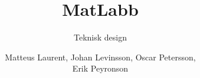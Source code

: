 \documentclass{beamer}
\title{MatLabb}
\subtitle{Teknisk design}
\author{Matteus Laurent, Johan Levinsson, Oscar Petersson,\\ Erik Peyronson}
\begin{document}
\frame{\titlepage}

\end{document}
